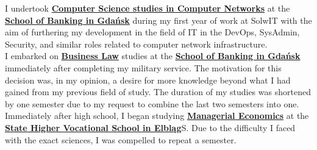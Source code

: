 \documentclass[theme]{cv_einstein}
\begin{document}
\begin{paracol}{2}
\begin{rightcolumn}
            {I undertook \href{https://www.merito.pl/gdansk/studia-i-szkolenia/studia-i-stopnia/kierunki-i-specjalnosci/informatyka/inzynieria-sieci-komputerowych}{\textbf{Computer Science studies in Computer Networks}} at the \href{https://www.merito.pl/gdansk/}{\textbf{School of Banking in Gdańsk}} during my first year of work at SolwIT with the aim of furthering my development in the field of IT in the DevOps, SysAdmin, Security, and similar roles related to computer network infrastructure.}
            \vspace{\itemspace}\\
            {I embarked on \href{https://www.merito.pl/gdansk/studia-i-szkolenia/studia-i-stopnia/kierunki-i-specjalnosci/prawo-w-biznesie/prawo-i-zarzadzanie}{\textbf{Business Law}} studies at the \href{https://www.merito.pl/gdansk/}{\textbf{School of Banking in Gdańsk}} immediately after completing my military service. The motivation for this decision was, in my opinion, a desire for more knowledge beyond what I had gained from my previous field of study. The duration of my studies was shortened by one semester due to my request to combine the last two semesters into one.}
            \vspace{\itemspace}\\
            {Immediately after high school, I began studying \href{https://ans-elblag.pl/studia-ekonomia-licencjackie.html}{\textbf{Managerial Economics}} at the \href{https://ans-elblag.pl/}{\textbf{State Higher Vocational School in Elbląg}}S. Due to the difficulty I faced with the exact sciences, I was compelled to repeat a semester.}
        \vspace{\sectionspace}
        \end{rightcolumn}


\end{paracol}
\end{document}
